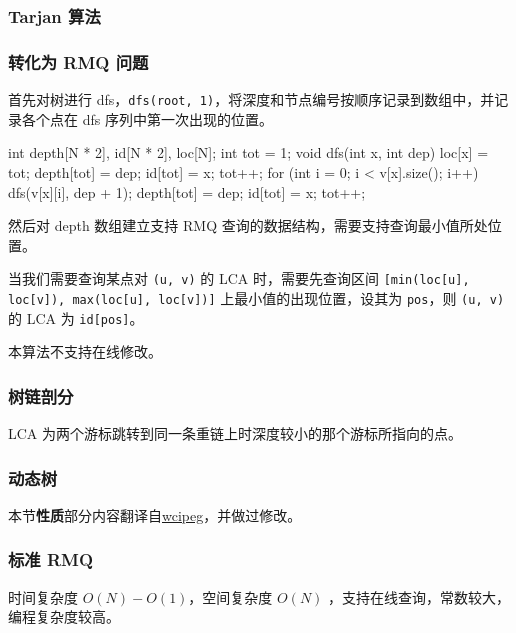 \subsubsection{Tarjan 算法}

\subsubsection{转化为 RMQ 问题}

首先对树进行 dfs，\texttt{dfs(root, 1)}，将深度和节点编号按顺序记录到数组中，并记录各个点在 dfs 序列中第一次出现的位置。

\begin{cppcode}
int depth[N * 2], id[N * 2], loc[N];
int tot = 1;
void dfs(int x, int dep) {
  loc[x] = tot;
  depth[tot] = dep;
  id[tot] = x;
  tot++;
  for (int i = 0; i < v[x].size(); i++) {
    dfs(v[x][i], dep + 1);
    depth[tot] = dep;
    id[tot] = x;
    tot++;
  }
}
\end{cppcode}

然后对 depth 数组建立支持 RMQ 查询的数据结构，需要支持查询最小值所处位置。

当我们需要查询某点对 \texttt{(u, v)} 的 LCA 时，需要先查询区间 \texttt{[min(loc[u], loc[v]), max(loc[u], loc[v])]} 上最小值的出现位置，设其为 \texttt{pos}，则 \texttt{(u, v)} 的 LCA 为 \texttt{id[pos]}。

本算法不支持在线修改。

\subsubsection{树链剖分}

LCA 为两个游标跳转到同一条重链上时深度较小的那个游标所指向的点。

\subsubsection{动态树}

\begin{QUOTE}{}{}
本节\textbf{性质}部分内容翻译自\href{http://wcipeg.com/wiki/Lowest_common_ancestor}{wcipeg}，并做过修改。
\end{QUOTE}

\subsubsection{标准 RMQ}

时间复杂度 $O(N)-O(1)$，空间复杂度 $O(N)$ ，支持在线查询，常数较大，编程复杂度较高。


